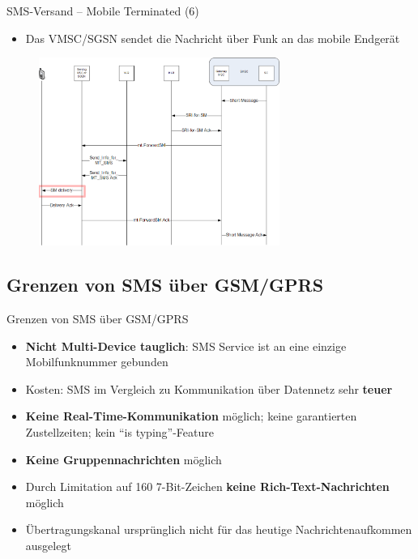 \documentclass{beamer}
\begin{document}
\begin{frame}{SMS-Versand -- Mobile Terminated (6)}

	\begin{itemize}
		\item Das VMSC/SGSN sendet die Nachricht über Funk an das mobile Endgerät
	\end{itemize}
	\begin{figure}[htm]
		\includegraphics[width=0.7\textwidth]{img/mt-forward-sm-6.png}
	\end{figure}
\end{frame}

\subsection{Grenzen von SMS über GSM/GPRS}
\begin{frame}{Grenzen von SMS über GSM/GPRS}
	\begin{itemize}
		\item \textbf{Nicht Multi-Device tauglich}: SMS Service ist an eine einzige 
			Mobilfunknummer gebunden
		\item Kosten: SMS im Vergleich zu Kommunikation über Datennetz sehr 
			\textbf{teuer}
		\item \textbf{Keine Real-Time-Kommunikation} möglich; keine garantierten Zustellzeiten; 
			kein ``is typing''-Feature
		\item \textbf{Keine Gruppennachrichten} möglich
		\item Durch Limitation auf 160 7-Bit-Zeichen \textbf{keine Rich-Text-Nachrichten} 
			möglich
		\item Übertragungskanal ursprünglich nicht für das heutige 
			Nachrichtenaufkommen ausgelegt
	\end{itemize}
\end{frame}
\end{document}

